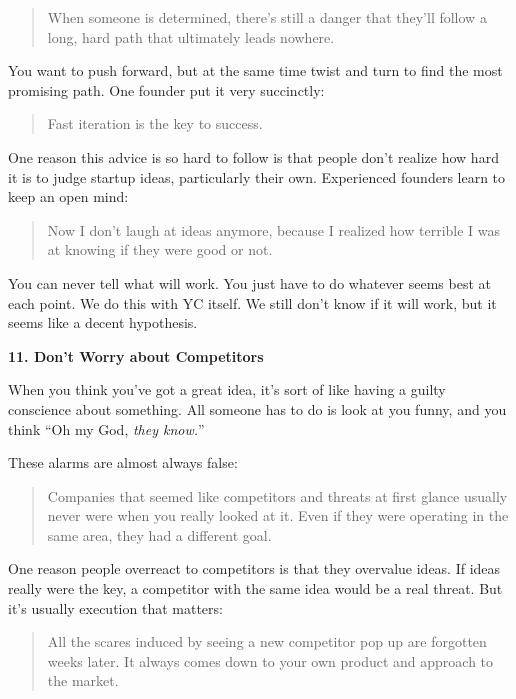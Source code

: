 \begin{quote}
When someone is determined, there's still a danger that they'll follow a
long, hard path that ultimately leads nowhere.
\end{quote}

You want to push forward, but at the same time twist and turn to find
the most promising path. One founder put it very succinctly:

\begin{quote}
Fast iteration is the key to success.
\end{quote}

One reason this advice is so hard to follow is that people don't realize
how hard it is to judge startup ideas, particularly their own.
Experienced founders learn to keep an open mind:

\begin{quote}
Now I don't laugh at ideas anymore, because I realized how terrible I
was at knowing if they were good or not.
\end{quote}

You can never tell what will work. You just have to do whatever seems
best at each point. We do this with YC itself. We still don't know if it
will work, but it seems like a decent hypothesis.

\textbf{11. Don't Worry about Competitors}

When you think you've got a great idea, it's sort of like having a
guilty conscience about something. All someone has to do is look at you
funny, and you think ``Oh my God, \emph{they know.}''

These alarms are almost always false:

\begin{quote}
Companies that seemed like competitors and threats at first glance
usually never were when you really looked at it. Even if they were
operating in the same area, they had a different goal.
\end{quote}

One reason people overreact to competitors is that they overvalue ideas.
If ideas really were the key, a competitor with the same idea would be a
real threat. But it's usually execution that matters:

\begin{quote}
All the scares induced by seeing a new competitor pop up are forgotten
weeks later. It always comes down to your own product and approach to
the market.
\end{quote}

